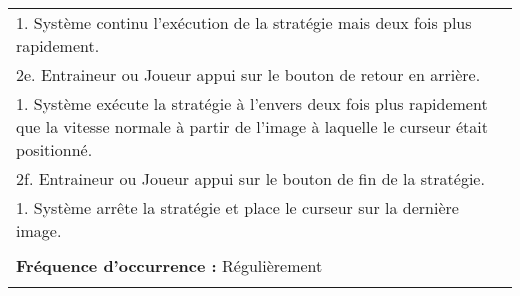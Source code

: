 \begin{longtable}{|p{16cm}|}
	\hspace{1cm}1. Système continu l'exécution de la stratégie mais deux fois plus rapidement.\\
	2e. Entraineur ou Joueur appui sur le bouton de retour en arrière.\\
	\hspace{1cm}1. Système exécute la stratégie à l'envers deux fois plus rapidement que la vitesse normale à partir de l'image à laquelle le curseur était positionné.\\
	2f. Entraineur ou Joueur appui sur le bouton de fin de la stratégie.\\
	\hspace{1cm}1. Système arrête la stratégie et place le curseur sur la dernière image.\\
	\\
	\textbf{Fréquence d'occurrence :} Régulièrement\\
	\\
	\hline
\end{longtable}

